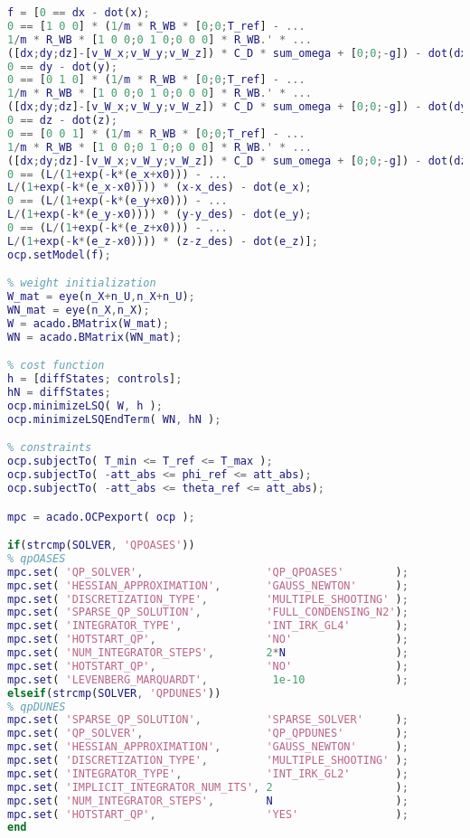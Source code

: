 \begin{lstlisting}[frame=single,language={Matlab},caption={MATLAB code for ACADO solver generation}]
% Nonlinear Subsystem
f = [0 == dx - dot(x);
0 == [1 0 0] * (1/m * R_WB * [0;0;T_ref] - ...
1/m * R_WB * [1 0 0;0 1 0;0 0 0] * R_WB.' * ...
([dx;dy;dz]-[v_W_x;v_W_y;v_W_z]) * C_D * sum_omega + [0;0;-g]) - dot(dx);
0 == dy - dot(y);
0 == [0 1 0] * (1/m * R_WB * [0;0;T_ref] - ...
1/m * R_WB * [1 0 0;0 1 0;0 0 0] * R_WB.' * ...
([dx;dy;dz]-[v_W_x;v_W_y;v_W_z]) * C_D * sum_omega + [0;0;-g]) - dot(dy);
0 == dz - dot(z);
0 == [0 0 1] * (1/m * R_WB * [0;0;T_ref] - ...
1/m * R_WB * [1 0 0;0 1 0;0 0 0] * R_WB.' * ...
([dx;dy;dz]-[v_W_x;v_W_y;v_W_z]) * C_D * sum_omega + [0;0;-g]) - dot(dz);
0 == (L/(1+exp(-k*(e_x+x0))) - ...
L/(1+exp(-k*(e_x-x0)))) * (x-x_des) - dot(e_x);
0 == (L/(1+exp(-k*(e_y+x0))) - ...
L/(1+exp(-k*(e_y-x0)))) * (y-y_des) - dot(e_y);
0 == (L/(1+exp(-k*(e_z+x0))) - ...
L/(1+exp(-k*(e_z-x0)))) * (z-z_des) - dot(e_z)];
ocp.setModel(f);

% weight initialization
W_mat = eye(n_X+n_U,n_X+n_U);
WN_mat = eye(n_X,n_X);
W = acado.BMatrix(W_mat);
WN = acado.BMatrix(WN_mat);

% cost function 
h = [diffStates; controls];
hN = diffStates;
ocp.minimizeLSQ( W, h );
ocp.minimizeLSQEndTerm( WN, hN );

% constraints
ocp.subjectTo( T_min <= T_ref <= T_max );
ocp.subjectTo( -att_abs <= phi_ref <= att_abs);
ocp.subjectTo( -att_abs <= theta_ref <= att_abs);

mpc = acado.OCPexport( ocp );

if(strcmp(SOLVER, 'QPOASES'))
% qpOASES
mpc.set( 'QP_SOLVER',                   'QP_QPOASES'    	);
mpc.set( 'HESSIAN_APPROXIMATION',       'GAUSS_NEWTON'      );
mpc.set( 'DISCRETIZATION_TYPE',         'MULTIPLE_SHOOTING' );
mpc.set( 'SPARSE_QP_SOLUTION',          'FULL_CONDENSING_N2');
mpc.set( 'INTEGRATOR_TYPE',             'INT_IRK_GL4'       ); 
mpc.set( 'HOTSTART_QP',                 'NO'                );
mpc.set( 'NUM_INTEGRATOR_STEPS',        2*N                 );
mpc.set( 'HOTSTART_QP',                 'NO'             	);
mpc.set( 'LEVENBERG_MARQUARDT', 		 1e-10				);
elseif(strcmp(SOLVER, 'QPDUNES'))
% qpDUNES
mpc.set( 'SPARSE_QP_SOLUTION',          'SPARSE_SOLVER'     ); 
mpc.set( 'QP_SOLVER',                   'QP_QPDUNES'        );
mpc.set( 'HESSIAN_APPROXIMATION',       'GAUSS_NEWTON'      );
mpc.set( 'DISCRETIZATION_TYPE',         'MULTIPLE_SHOOTING' );
mpc.set( 'INTEGRATOR_TYPE',             'INT_IRK_GL2'       ); 
mpc.set( 'IMPLICIT_INTEGRATOR_NUM_ITS', 2                   ); 
mpc.set( 'NUM_INTEGRATOR_STEPS',        N                   ); 
mpc.set( 'HOTSTART_QP',                 'YES'             	); 
end




\end{lstlisting}
